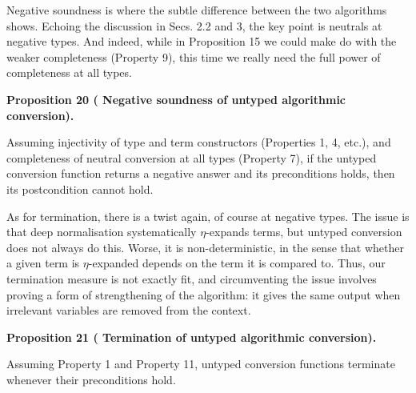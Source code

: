  
Negative soundness is where the subtle difference between the two algorithms shows. Echoing the discussion in Secs. 2.2 and 3, the key point is neutrals at negative types. And indeed, while in Proposition 15 we could make do with the weaker completeness (Property 9), this time we really need the full power of completeness at all types.\par
 
 
 
\par\medskip\noindent\textbf{Proposition 20 (  Negative soundness of untyped algorithmic conversion).}\par
 
 
Assuming injectivity of type and term constructors (Properties 1, 4, etc.), and completeness of neutral conversion at all types (Property 7), if the untyped conversion function returns a negative answer and its preconditions holds, then its postcondition cannot hold.\par
 
 
 
 
As for termination, there is a twist again, of course at negative types. The issue is that deep normalisation systematically $\eta$-expands terms, but untyped conversion does not always do this. Worse, it is non-deterministic, in the sense that whether a given term is $\eta$-expanded depends on the term it is compared to. Thus, our termination measure is not exactly fit, and circumventing the issue involves proving a form of strengthening of the algorithm: it gives the same output when irrelevant variables are removed from the context.\par
 
 
 
\par\medskip\noindent\textbf{Proposition 21 (  Termination of untyped algorithmic conversion).}\par
 
 
Assuming Property 1 and Property 11, untyped conversion functions terminate whenever their preconditions hold.\par
 
